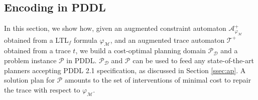 \subsection{Encoding in PDDL}\label{ssec:eip}

\newcommand{\myi}{\emph{(i)}\xspace}
\newcommand{\myii}{\emph{(ii)}\xspace}
\newcommand{\myiii}{\emph{(iii)}\xspace}
\newcommand{\myiv}{\emph{(iv)}\xspace}
\newcommand{\myv}{\emph{(v)}\xspace}
\newcommand{\myvi}{\emph{(vi)}\xspace}
\newcommand{\A}{\mathcal{A}}
\newcommand{\T}{\mathcal{T}}
\newcommand{\PDDL}[1]{\begin{footnotesize}\texttt{#1}\end{footnotesize}}

\sloppypar

In this section, we show how, given an augmented constraint automaton $\mathcal{A}_{\varphi_{\mathcal{M}}}^+$ obtained from a LTL$_f$ formula  $\varphi_{\mathcal{M}}$, and an augmented trace automaton $\T^+$ obtained from a trace $t$, we build a cost-optimal planning domain $\mathcal{P_D}$ and a problem instance $\mathcal{P}$ in PDDL. $\mathcal{P_D}$ and $\mathcal{P}$ can be used to feed any state-of-the-art planners accepting PDDL 2.1 specification, as discussed in Section \ref{ssec:ap}.
%
A solution plan for $\mathcal{P}$ amounts to the set of interventions of minimal cost to repair the trace with respect to $\varphi_{\mathcal{M}}$.

